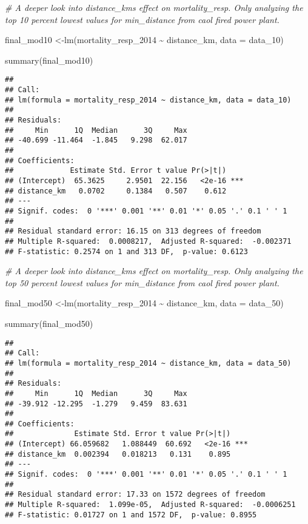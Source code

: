 \documentclass[
]{article}
\newenvironment{Shaded}{\begin{snugshade}}{\end{snugshade}}
\newcommand{\AttributeTok}[1]{\textcolor[rgb]{0.77,0.63,0.00}{#1}}
\newcommand{\CommentTok}[1]{\textcolor[rgb]{0.56,0.35,0.01}{\textit{#1}}}
\newcommand{\FunctionTok}[1]{\textcolor[rgb]{0.00,0.00,0.00}{#1}}
\newcommand{\NormalTok}[1]{#1}
\newcommand{\OtherTok}[1]{\textcolor[rgb]{0.56,0.35,0.01}{#1}}
\newcommand{\SpecialCharTok}[1]{\textcolor[rgb]{0.00,0.00,0.00}{#1}}
\begin{document}
\begin{Shaded}
\begin{Highlighting}[]
\CommentTok{\# A deeper look into distance\_km\textquotesingle{}s effect on mortality\_resp. Only analyzing the top 10 percent lowest values for min\_distance from caol fired power plant. }

\NormalTok{final\_mod10 }\OtherTok{\textless{}{-}}\FunctionTok{lm}\NormalTok{(mortality\_resp\_2014 }\SpecialCharTok{\textasciitilde{}}\NormalTok{ distance\_km, }\AttributeTok{data =}\NormalTok{ data\_10)}

\FunctionTok{summary}\NormalTok{(final\_mod10)}
\end{Highlighting}
\end{Shaded}

\begin{verbatim}
## 
## Call:
## lm(formula = mortality_resp_2014 ~ distance_km, data = data_10)
## 
## Residuals:
##     Min      1Q  Median      3Q     Max 
## -40.699 -11.464  -1.845   9.298  62.017 
## 
## Coefficients:
##             Estimate Std. Error t value Pr(>|t|)    
## (Intercept)  65.3625     2.9501  22.156   <2e-16 ***
## distance_km   0.0702     0.1384   0.507    0.612    
## ---
## Signif. codes:  0 '***' 0.001 '**' 0.01 '*' 0.05 '.' 0.1 ' ' 1
## 
## Residual standard error: 16.15 on 313 degrees of freedom
## Multiple R-squared:  0.0008217,  Adjusted R-squared:  -0.002371 
## F-statistic: 0.2574 on 1 and 313 DF,  p-value: 0.6123
\end{verbatim}

\begin{Shaded}
\begin{Highlighting}[]
\CommentTok{\# A deeper look into distance\_km\textquotesingle{}s effect on mortality\_resp. Only analyzing the top 50 percent lowest values for min\_distance from caol fired power plant. }

\NormalTok{final\_mod50 }\OtherTok{\textless{}{-}}\FunctionTok{lm}\NormalTok{(mortality\_resp\_2014 }\SpecialCharTok{\textasciitilde{}}\NormalTok{ distance\_km, }\AttributeTok{data =}\NormalTok{ data\_50)}

\FunctionTok{summary}\NormalTok{(final\_mod50)}
\end{Highlighting}
\end{Shaded}

\begin{verbatim}
## 
## Call:
## lm(formula = mortality_resp_2014 ~ distance_km, data = data_50)
## 
## Residuals:
##     Min      1Q  Median      3Q     Max 
## -39.912 -12.295  -1.279   9.459  83.631 
## 
## Coefficients:
##              Estimate Std. Error t value Pr(>|t|)    
## (Intercept) 66.059682   1.088449  60.692   <2e-16 ***
## distance_km  0.002394   0.018213   0.131    0.895    
## ---
## Signif. codes:  0 '***' 0.001 '**' 0.01 '*' 0.05 '.' 0.1 ' ' 1
## 
## Residual standard error: 17.33 on 1572 degrees of freedom
## Multiple R-squared:  1.099e-05,  Adjusted R-squared:  -0.0006251 
## F-statistic: 0.01727 on 1 and 1572 DF,  p-value: 0.8955
\end{verbatim}
\end{document}
